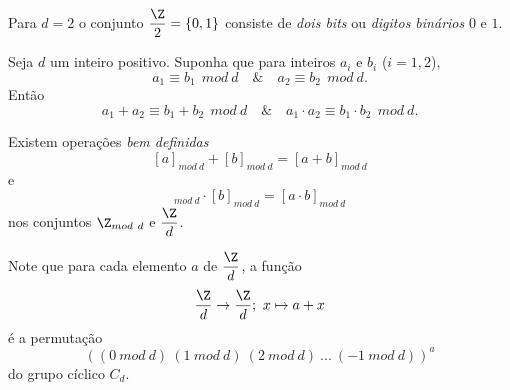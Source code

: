       Para $d=2$ o conjunto $\dfrac{\Z}{2} = \{0,1\}$ consiste de \emph{dois bits} ou \emph{digitos binários} $0$ e $1$.
      \begin{stat}
         Seja $d$ um inteiro positivo. Suponha que para inteiros $a_{i}$ e $b_{i}$ ($i = 1,2$), $$a_{1} \equiv b_{1}\ \ mod\ d\quad \&\quad a_{2} \equiv b_{2}\ \ mod\ d.$$ Então $$a_{1} + a_{2} \equiv b_{1} + b_{2}\ \ mod\ d\quad \&\quad a_{1}\cdot a_{2} \equiv b_{1} \cdot b_{2}\ \ mod\ d.$$
      \end{stat}
      \begin{corollary}
         Existem operações \emph{bem definidas}
         \begin{equation}\label{ADITTOP}
            [a]_{mod\ d} + [b]_{mod\ d} = [a+b]_{mod\ d}
         \end{equation}
         e
         \begin{equation}
            [a]_{mod\ d} \cdot [b]_{mod\ d} = [a\cdot b]_{mod\ d}
         \end{equation}
         nos conjuntos $\Z_{mod\ d}$ e $\dfrac{\Z}{d}$.
      \end{corollary}
      Note que para cada elemento $a$ de $\dfrac{\Z}{d}$, a função $$\dfrac{\Z}{d} \to \dfrac{\Z}{d};\ x\mapsto a+x$$
      é a permutação $$\left((0\ mod\ d)\ (1\ mod\ d)\ (2\ mod\ d)\ ...\ (-1\ mod\ d)\right)^{a}$$ do grupo cíclico $C_{d}$.
\newpage



